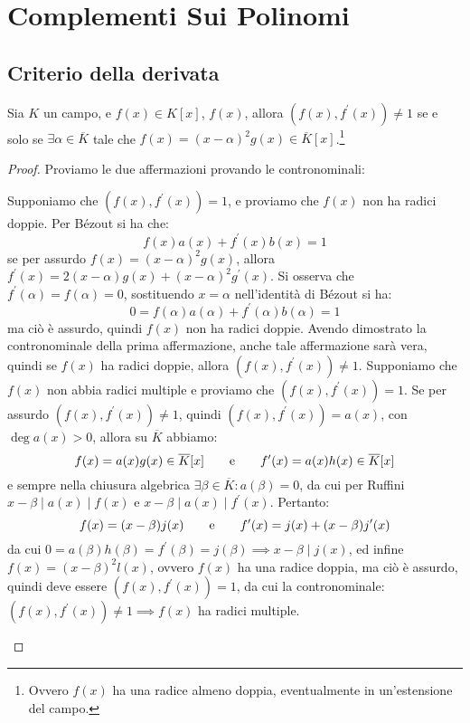 \documentclass[11pt]{scrartcl}
\begin{document}
\newpage
\section{Complementi Sui Polinomi}
\subsection{Criterio della derivata}
\begin{theorem}
	\label{p:der}
	Sia $K$ un campo, e $f(x) \in K[x]$, $f(x)$, allora $(f(x),f^{\prime}(x)) \ne 1$ se e solo se $\exists \alpha \in \overline K$ tale che $f(x) = (x - \alpha)^2g(x) \in \overline K[x]$.\footnote{Ovvero $f(x)$ ha una radice almeno doppia, eventualmente in un'estensione del campo.}
\end{theorem}

\begin{proof}
	Proviamo le due affermazioni provando le contronominali:
		\begin{itemize}
		\ii Supponiamo che $(f(x),f^{\prime}(x)) = 1$, e proviamo che $f(x)$ non ha radici doppie. Per Bézout si ha che:
			\[ f(x)a(x) + f^{\prime}(x)b(x) = 1
			\]
		se per assurdo $f(x) = (x - \alpha)^2g(x)$, allora $f^{\prime}(x) = 2(x - \alpha)g(x) +  (x - \alpha)^2g^{\prime}(x)$. Si osserva che $f^{\prime}(\alpha) =
		 f(\alpha) = 0$, sostituendo $x = \alpha$ nell'identità di Bézout si ha:
		 	\[ 0 = f(\alpha)a(\alpha) + f^{\prime}(\alpha)b(\alpha) = 1
		 	\]
		ma ciò è assurdo, quindi $f(x)$ non ha radici doppie. Avendo dimostrato la contronominale della prima affermazione, anche tale affermazione sarà vera, quindi
		se  $f(x)$ ha radici doppie, allora $(f(x),f^{\prime}(x)) \ne 1$.
		\ii Supponiamo che $f(x)$ non abbia radici multiple e proviamo che $(f(x),f^{\prime}(x)) = 1$. Se per assurdo $(f(x),f^{\prime}(x)) \ne 1$, quindi 
		$(f(x),f^{\prime}(x)) = a(x)$, con $\deg a(x) > 0$, allora su $\overline K$ abbiamo:
			\[ f(x) = a(x)g(x) \in \overline K[x]
			\qquad
			\text e
			\qquad
			f^{\prime}(x) = a(x)h(x) \in \overline K[x]
			\]
		e sempre nella chiusura algebrica $\exists \beta \in \overline K : a(\beta) = 0$, da cui per Ruffini $x - \beta \mid a(x) \mid f(x)$ e $x - \beta \mid a(x) \mid f^{\prime}(x)$.
		Pertanto:
			\[ f(x) = (x - \beta)j(x)
			\qquad
			\text e
			\qquad
			f^{\prime}(x) = j(x) +  (x - \beta)j^{\prime}(x)
			\]
		da cui $0 =  a(\beta)h(\beta) = f^{\prime}(\beta) = j(\beta) \implies x - \beta \mid j(x)$, ed infine $f(x) = (x - \beta)^2l(x)$, ovvero $f(x)$ ha una radice doppia, 
		ma ciò è assurdo, quindi deve essere $(f(x),f^{\prime}(x)) = 1$, da cui la contronominale: $(f(x),f^{\prime}(x)) \ne 1  \implies f(x)$ ha radici multiple.
		\end{itemize}
\end{proof}
\end{document}

